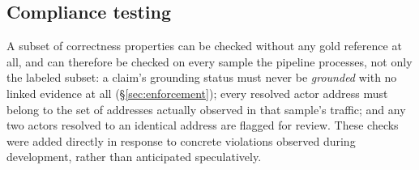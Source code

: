 \documentclass[sigconf,nonacm]{acmart}
\begin{document}
\subsection{Compliance testing}

A subset of correctness properties can be checked without any gold reference
at all, and can therefore be checked on every sample the pipeline processes,
not only the labeled subset: a claim's grounding status must never be
\emph{grounded} with no linked evidence at all (\S\ref{sec:enforcement}); every
resolved actor address must belong to the set of addresses actually observed
in that sample's traffic; and any two actors resolved to an identical address
are flagged for review. These checks were added directly in response to
concrete violations observed during development, rather than anticipated
speculatively.



\end{document}
